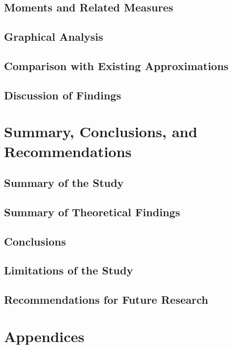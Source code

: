 \documentclass[11pt]{report}
\begin{document}
\section{Moments and Related Measures}

\section{Graphical Analysis}

\section{Comparison with Existing Approximations}


\section{Discussion of Findings}


\chapter{Summary, Conclusions, and Recommendations}

\section{Summary of the Study}


\section{Summary of Theoretical Findings}

\section{Conclusions}

\section{Limitations of the Study}

\section{Recommendations for Future Research}



\chapter*{Appendices}

\end{document}
